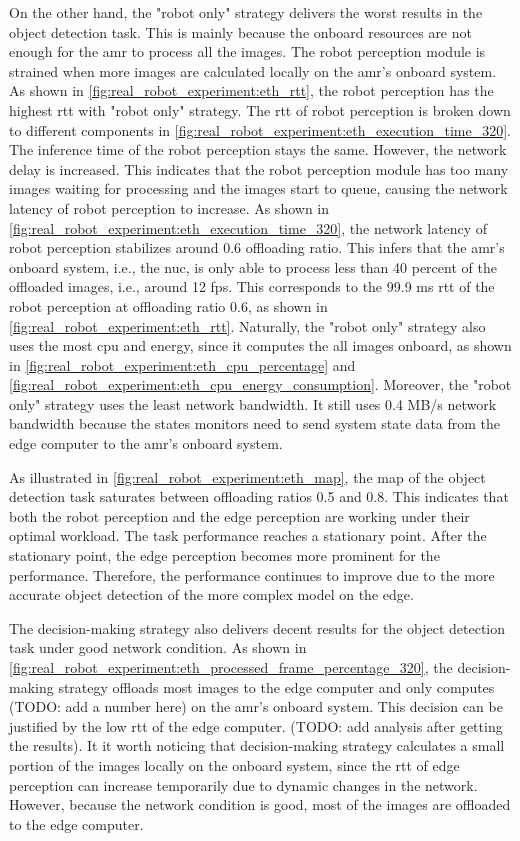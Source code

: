 On the other hand, the "robot only" strategy delivers the worst results in the object detection task. This is mainly because the onboard resources are not enough for the \gls{amr} to process all the images. The robot perception module is strained when more images are calculated locally on the \gls{amr}'s onboard system. As shown in \cref{fig:real_robot_experiment:eth_rtt}, the robot perception has the highest \gls{rtt} with "robot only" strategy. The \gls{rtt} of robot perception is broken down to different components in \cref{fig:real_robot_experiment:eth_execution_time_320}. The inference time of the robot perception stays the same. However, the network delay is increased. This indicates that the robot perception module has too many images waiting for processing and the images start to queue, causing the network latency of robot perception to increase. As shown in \cref{fig:real_robot_experiment:eth_execution_time_320}, the network latency of robot perception stabilizes around 0.6 offloading ratio. This infers that the \gls{amr}'s onboard system, i.e., the \gls{nuc}, is only able to process less than 40 percent of the offloaded images, i.e., around 12 \gls{fps}. This corresponds to the 99.9 ms \gls{rtt} of the robot perception at offloading ratio 0.6, as shown in \cref{fig:real_robot_experiment:eth_rtt}. Naturally, the "robot only" strategy also uses the most \gls{cpu} and energy, since it computes the all images onboard, as shown in \cref{fig:real_robot_experiment:eth_cpu_percentage} and \cref{fig:real_robot_experiment:eth_cpu_energy_consumption}. Moreover, the "robot only" strategy uses the least network bandwidth. It still uses 0.4 MB/s network bandwidth because the states monitors need to send system state data from the edge computer to the \gls{amr}'s onboard system.

As illustrated in \cref{fig:real_robot_experiment:eth_map}, the \gls{map} of the object detection task saturates between offloading ratios 0.5 and 0.8. This indicates that both the robot perception and the edge perception are working under their optimal workload. The task performance reaches a stationary point. After the stationary point, the edge perception becomes more prominent for the performance. Therefore, the performance continues to improve due to the more accurate object detection of the more complex model on the edge. 

The decision-making strategy also delivers decent results for the object detection task under good network condition. As shown in \cref{fig:real_robot_experiment:eth_processed_frame_percentage_320}, the decision-making strategy offloads most images to the edge computer and only computes (TODO: add a number here) on the \gls{amr}'s onboard system. This decision can be justified by the low \gls{rtt} of the edge computer. (TODO: add analysis after getting the results). It it worth noticing that decision-making strategy calculates a small portion of the images locally on the onboard system, since the \gls{rtt} of edge perception can increase temporarily due to dynamic changes in the network. However, because the network condition is good, most of the images are offloaded to the edge computer. 

